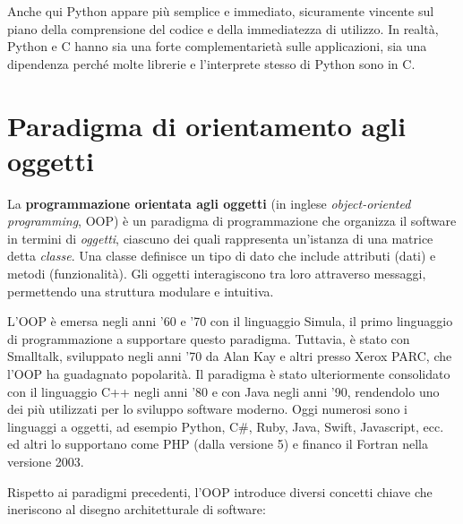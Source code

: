 \documentclass[
  letterpaper,
]{scrbook}
\begin{document}
Anche qui Python appare più semplice e immediato, sicuramente vincente
sul piano della comprensione del codice e della immediatezza di
utilizzo. In realtà, Python e C hanno sia una forte complementarietà
sulle applicazioni, sia una dipendenza perché molte librerie e
l'interprete stesso di Python sono in C.

\section{Paradigma di orientamento agli
oggetti}\label{paradigma-di-orientamento-agli-oggetti}

La \textbf{programmazione orientata agli oggetti} (in inglese
\emph{object-oriented programming}, OOP) è un paradigma di
programmazione che organizza il software in termini di \emph{oggetti},
ciascuno dei quali rappresenta un'istanza di una matrice detta
\emph{classe}. Una classe definisce un tipo di dato che include
attributi (dati) e metodi (funzionalità). Gli oggetti interagiscono tra
loro attraverso messaggi, permettendo una struttura modulare e
intuitiva.

L'OOP è emersa negli anni '60 e '70 con il linguaggio Simula, il primo
linguaggio di programmazione a supportare questo paradigma. Tuttavia, è
stato con Smalltalk, sviluppato negli anni '70 da Alan Kay e altri
presso Xerox PARC, che l'OOP ha guadagnato popolarità. Il paradigma è
stato ulteriormente consolidato con il linguaggio C++ negli anni '80 e
con Java negli anni '90, rendendolo uno dei più utilizzati per lo
sviluppo software moderno. Oggi numerosi sono i linguaggi a oggetti, ad
esempio Python, C\#, Ruby, Java, Swift, Javascript, ecc. ed altri lo
supportano come PHP (dalla versione 5) e financo il Fortran nella
versione 2003.

Rispetto ai paradigmi precedenti, l'OOP introduce diversi concetti
chiave che ineriscono al disegno architetturale di software:
\end{document}
